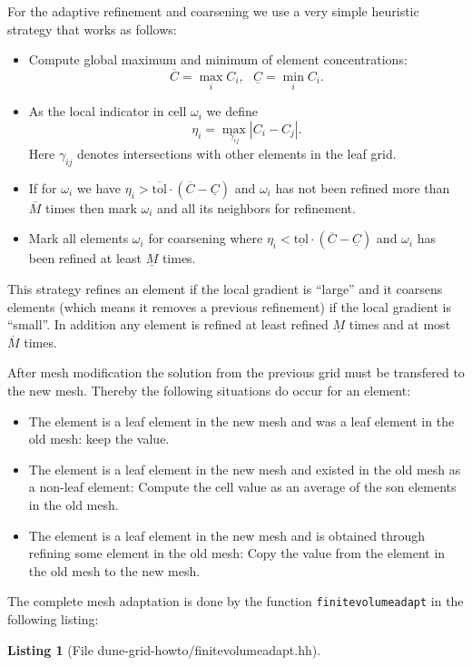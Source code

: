 \documentclass[11pt,a4paper,headinclude,footinclude,DIV16,normalheadings]{scrreprt}
\newtheorem{lst}{Listing}
\begin{document}
For the adaptive refinement and coarsening we use a very simple
heuristic strategy that works as follows:
\begin{itemize}
\item Compute global maximum and minimum of element concentrations:
  $$\overline{C}=\max_i C_i,  \ \ \ \underline{C}=\min_i C_i.$$
\item As the local indicator in cell $\omega_i$ we define $$\eta_i =
  \max_{\gamma_{ij}} |C_i-C_j|.$$ Here $\gamma_{ij}$ denotes
  intersections with other elements in the leaf grid.
\item If for $\omega_i$ we have
  $\eta_i>\overline{\text{tol}}\cdot (\overline{C}-\underline{C})$
  and $\omega_i$ has not been refined more than $\overline{M}$ times
  then mark $\omega_i$ and all its neighbors for refinement.
\item Mark all elements $\omega_i$ for coarsening where
  $\eta_i<\underline{\text{tol}}\cdot (\overline{C}-\underline{C})$
  and $\omega_i$ has been refined at least $\underline{M}$ times.
\end{itemize}

This strategy refines an element if the local gradient is ``large''
and it coarsens elements (which means it removes a previous
refinement) if the local gradient is ``small''. In addition any
element is refined at least refined $\underline{M}$ times and at most
$\overline{M}$ times.

After mesh modification the solution from the previous grid must be
transfered to the new mesh. Thereby the following situations do occur
for an element:
\begin{itemize}
\item The element is a leaf element in the new mesh and was a leaf
  element in the old mesh: keep the value.
\item The element is a leaf element in the new mesh and existed in the
  old mesh as a non-leaf element: Compute the cell value as an average
  of the son elements in the old mesh.
\item The element is a leaf element in the new mesh and is obtained
  through refining some element in the old mesh: Copy the value
  from the element in the old mesh to the new mesh.
\end{itemize}

The complete mesh adaptation is done by the function
\lstinline!finitevolumeadapt! in the following listing:

\begin{lst}[File dune-grid-howto/finitevolumeadapt.hh] \mbox{}
\nopagebreak

\end{lst}
\end{document}
